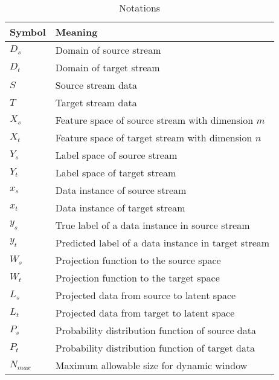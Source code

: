 \begin{table}[t]
\centering
\caption{Notations}
\label{tab:notations}
\begin{tabular}{|l|l|}
\hline
Symbol & Meaning \\ \hline
 $D_{s}$ & Domain of source stream \\ \hline
 $D_{t}$ & Domain of target stream \\ \hline
 $S$ & Source stream data\\ \hline
 $T$ & Target stream data \\ \hline
 $X_{s}$ & Feature space of source stream with dimension $m$ \\ \hline
 $X_{t}$ & Feature space of target stream with dimension $n$ \\ \hline
 $Y_{s}$ & Label space of source stream \\ \hline
 $Y_{t}$ & Label space of target stream \\ \hline
 $x_{s}$ & Data instance of source stream \\ \hline
 $x_{t}$ & Data instance of target stream \\ \hline
 $y_{s}$ & True label of a data instance in source stream \\ \hline
 $y_{t}$ & Predicted label of a data instance in target stream \\ \hline
 $W_{s}$ & Projection function to the source space \\ \hline
 $W_{t}$ & Projection function to the target space \\ \hline
 $L_{s}$ & Projected data from source to latent space \\ \hline
 $L_{t}$ & Projected data from target to latent space \\ \hline
 $P_{s}$ & Probability distribution function of source data \\ \hline 
 $P_{t}$ & Probability distribution function of target data \\ \hline
 $N_{max}$ & Maximum allowable size for dynamic window \\ \hline
\end{tabular}
\end{table}

